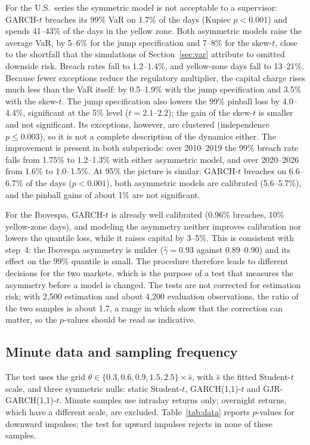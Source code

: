 \documentclass[11pt,a4paper]{article}
\theoremstyle{definition}
\theoremstyle{remark}
\begin{document}
For the U.S.\ series the symmetric model is not acceptable to a supervisor: GARCH-$t$ breaches its 99\% VaR on 1.7\% of the days (Kupiec $p<0.001$) and spends 41--43\% of the days in the yellow zone. Both asymmetric models raise the average VaR, by 5--6\% for the jump specification and 7--8\% for the skew-$t$, close to the shortfall that the simulations of Section~\ref{sec:var} attribute to omitted downside risk. Breach rates fall to 1.2--1.4\%, and yellow-zone days fall to 13--21\%. Because fewer exceptions reduce the regulatory multiplier, the capital charge rises much less than the VaR itself: by 0.5--1.9\% with the jump specification and 3.5\% with the skew-$t$. The jump specification also lowers the 99\% pinball loss by 4.0--4.4\%, significant at the 5\% level ($t=2.1$--$2.2$); the gain of the skew-$t$ is smaller and not significant. Its exceptions, however, are clustered (independence $p\le0.003$), so it is not a complete description of the dynamics either. The improvement is present in both subperiods: over 2010--2019 the 99\% breach rate falls from 1.75\% to 1.2--1.3\% with either asymmetric model, and over 2020--2026 from 1.6\% to 1.0--1.5\%. At 95\% the picture is similar: GARCH-$t$ breaches on 6.6--6.7\% of the days ($p<0.001$), both asymmetric models are calibrated (5.6--5.7\%), and the pinball gains of about 1\% are not significant.

For the Ibovespa, GARCH-$t$ is already well calibrated (0.96\% breaches, 10\% yellow-zone days), and modeling the asymmetry neither improves calibration nor lowers the quantile loss, while it raises capital by 3--5\%. This is consistent with step~4: the Ibovespa asymmetry is milder ($\hat\gamma=0.93$ against 0.89--0.90) and its effect on the 99\% quantile is small. The procedure therefore leads to different decisions for the two markets, which is the purpose of a test that measures the asymmetry before a model is changed. The tests are not corrected for estimation risk; with 2{,}500 estimation and about 4{,}200 evaluation observations, the ratio of the two samples is about 1.7, a range in which \citet{escanciano2010} show that the correction can matter, so the $p$-values should be read as indicative.

\subsection{Minute data and sampling frequency}\label{sec:minute}
The test uses the grid $\theta\in\{0.3,0.6,0.9,1.5,2.5\}\times\hat s$, with $\hat s$ the fitted Student-$t$ scale, and three symmetric nulls: static Student-$t$, GARCH(1,1)-$t$ and GJR-GARCH(1,1)-$t$. Minute samples use intraday returns only; overnight returns, which have a different scale, are excluded. Table~\ref{tab:data} reports $p$-values for downward impulses; the test for upward impulses rejects in none of these samples.
\end{document}
